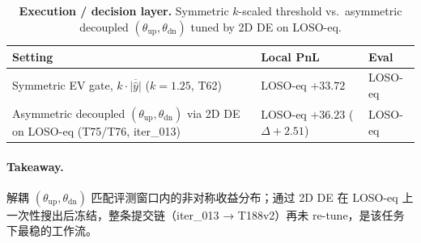 \documentclass[11pt]{article}
\begin{document}
\begin{table}[!htbp]
\centering
\caption{\textbf{Execution / decision layer.} Symmetric $k$-scaled threshold vs.\ asymmetric decoupled $(\theta_{\text{up}}, \theta_{\text{dn}})$ tuned by 2D DE on LOSO-eq.}
\label{tab:abl_exec}
\setlength{\tabcolsep}{5pt}\renewcommand{\arraystretch}{1.15}
\small
\begin{tabularx}{\textwidth}{@{}>{\raggedright\arraybackslash}X >{\raggedleft\arraybackslash}p{2.6cm} >{\raggedright\arraybackslash}p{2.2cm}@{}}
\toprule
Setting & Local PnL & Eval \\
\midrule
Symmetric EV gate, $k\!\cdot\!\overline{|\hat y|}$ ($k{=}1.25$, T62)                                                       & LOSO-eq $+33.72$ & LOSO-eq \\
Asymmetric decoupled $(\theta_{\text{up}}, \theta_{\text{dn}})$ via 2D DE on LOSO-eq (T75/T76, iter\_013)                  & LOSO-eq $+36.23$ ($\Delta+2.51$) & LOSO-eq \\
\bottomrule
\end{tabularx}
\end{table}

\paragraph{Takeaway.}
解耦 $(\theta_{\text{up}}, \theta_{\text{dn}})$ 匹配评测窗口内的非对称收益分布；通过 2D DE 在 LOSO-eq 上一次性搜出后冻结，整条提交链（iter\_013 → T188v2）再未 re-tune，是该任务下最稳的工作流。
\end{document}
